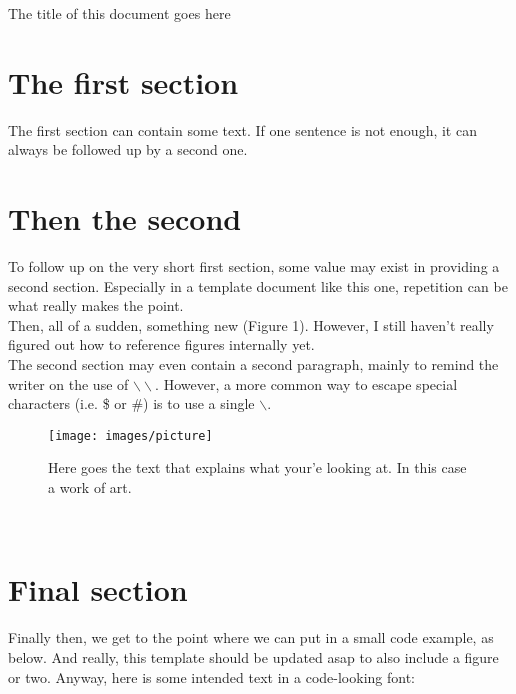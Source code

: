 \documentclass[12pt]{article} %
\begin{document}
\begin{center}
\LARGE{The title of this document goes here}
\end{center}

\vspace{5mm} %

\section*{The first section} %
The first section can contain some text. If one sentence is not enough, it can always be followed up by a second one.\\

\section*{Then the second}
To follow up on the very short first section, some value may exist in providing a second section. Especially in a template document like this one, repetition can be what really makes the point. \\

Then, all of a sudden, something new (Figure 1). However, I still haven't really figured out how to reference figures internally yet.\\

The second section may even contain a second paragraph, mainly to remind the writer on the use of $\backslash\backslash$. However, a more common way to escape special characters (i.e. \$ or \#) is to use a single $\backslash$. \\

\begin{figure}[h]
\captionsetup{labelfont=bf, width=100mm, font=footnotesize}
\texttt{[image: images/picture]}
\centering
\caption{Here goes the text that explains what your'e looking at. In this case a work of art.}
\end{figure} \\

\section*{Final section}
Finally then, we get to the point where we can put in a small code example, as below. And really, this template should be updated asap to also include a figure or two. Anyway, here is some intended text in a code-looking font:\\
\end{document}
